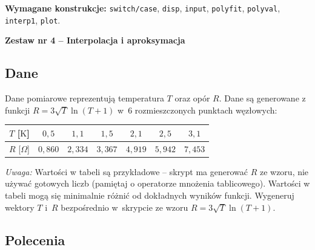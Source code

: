 \documentclass[a4paper,11pt]{article}
\begin{document}
\vspace{0.3cm}
\begin{ramka}
\textbf{Wymagane konstrukcje:}
\texttt{switch/case}, \texttt{disp}, \texttt{input}, \texttt{polyfit}, \texttt{polyval}, \texttt{interp1}, \texttt{plot}.
\end{ramka}

\clearpage
\begin{center}
  {\large\bfseries Zestaw nr 4 \quad -- \quad Interpolacja i aproksymacja}
\end{center}
\hrulefill
\vspace{0.4cm}

\subsection*{Dane}

Dane pomiarowe reprezentują temperatura $T$ oraz opór $R$.
Dane są generowane z funkcji $R = 3\sqrt{T}\ln(T+1)$ w~6 rozmieszczonych punktach węzłowych:

\begin{center}
\begin{tabular}{c|cccccc}
  \toprule
  $T$ [$\text{K}$] & $0{,}5$ & $1{,}1$ & $1{,}5$ & $2{,}1$ & $2{,}5$ & $3{,}1$ \\
  \midrule
  $R$ [$\Omega$] & $0{,}860$ & $2{,}334$ & $3{,}367$ & $4{,}919$ & $5{,}942$ & $7{,}453$ \\
  \bottomrule
\end{tabular}
\end{center}

\medskip
\textit{Uwaga:} Wartości w tabeli są przykładowe – skrypt ma generować $R$ ze wzoru, nie używać gotowych liczb (pamiętaj o operatorze mnożenia tablicowego). Wartości w tabeli mogą się minimalnie różnić od dokładnych wyników funkcji.
Wygeneruj wektory $T$ i~$R$ bezpośrednio w~skrypcie ze wzoru $R = 3\sqrt{T}\ln(T+1)$.

\subsection*{Polecenia}
\end{document}
